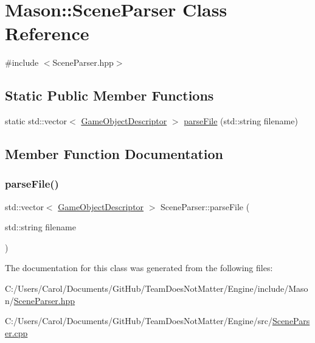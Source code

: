 \hypertarget{class_mason_1_1_scene_parser}{}\section{Mason\+:\+:Scene\+Parser Class Reference}
\label{class_mason_1_1_scene_parser}


{\ttfamily \#include $<$Scene\+Parser.\+hpp$>$}

\subsection*{Static Public Member Functions}
\begin{DoxyCompactItemize}
\item 
static std\+::vector$<$ \hyperlink{class_mason_1_1_game_object_descriptor}{Game\+Object\+Descriptor} $>$ \hyperlink{class_mason_1_1_scene_parser_a3f69f475dee046264762e618e70b78e6}{parse\+File} (std\+::string filename)
\end{DoxyCompactItemize}


\subsection{Member Function Documentation}
\hypertarget{class_mason_1_1_scene_parser_a3f69f475dee046264762e618e70b78e6}{}\label{class_mason_1_1_scene_parser_a3f69f475dee046264762e618e70b78e6} 
\subsubsection{\texorpdfstring{parse\+File()}{parseFile()}}
{\footnotesize\ttfamily std\+::vector$<$ \hyperlink{class_mason_1_1_game_object_descriptor}{Game\+Object\+Descriptor} $>$ Scene\+Parser\+::parse\+File (\begin{DoxyParamCaption}\item[{std\+::string}]{filename }\end{DoxyParamCaption})\hspace{0.3cm}{\ttfamily [static]}}



The documentation for this class was generated from the following files\+:\begin{DoxyCompactItemize}
\item 
C\+:/\+Users/\+Carol/\+Documents/\+Git\+Hub/\+Team\+Does\+Not\+Matter/\+Engine/include/\+Mason/\hyperlink{_scene_parser_8hpp}{Scene\+Parser.\+hpp}\item 
C\+:/\+Users/\+Carol/\+Documents/\+Git\+Hub/\+Team\+Does\+Not\+Matter/\+Engine/src/\hyperlink{_scene_parser_8cpp}{Scene\+Parser.\+cpp}\end{DoxyCompactItemize}
